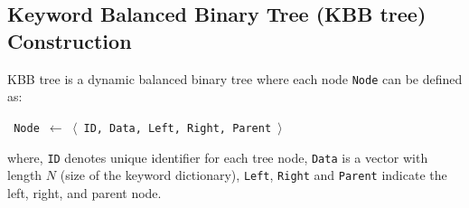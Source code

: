 \documentclass[sigconf,pdftex]{acmart}
\begin{document}





\subsection{Keyword Balanced Binary Tree (KBB tree) Construction}




KBB tree \cite{xia2015secure} is a dynamic balanced binary tree where each node \texttt{Node} can be defined as:
\begin{center} 
{\texttt{
 Node $\leftarrow$ $\langle$ ID, Data, Left, Right, Parent $\rangle$}
}
\end{center}
where, 
\newline\texttt{ID} denotes unique identifier for each tree node,
\newline\texttt{Data} is a vector with length $N$ (size of the keyword dictionary),
\newline\texttt{Left}, \texttt{Right} and \texttt{Parent} indicate the left, right, and parent node. 
\end{document}

